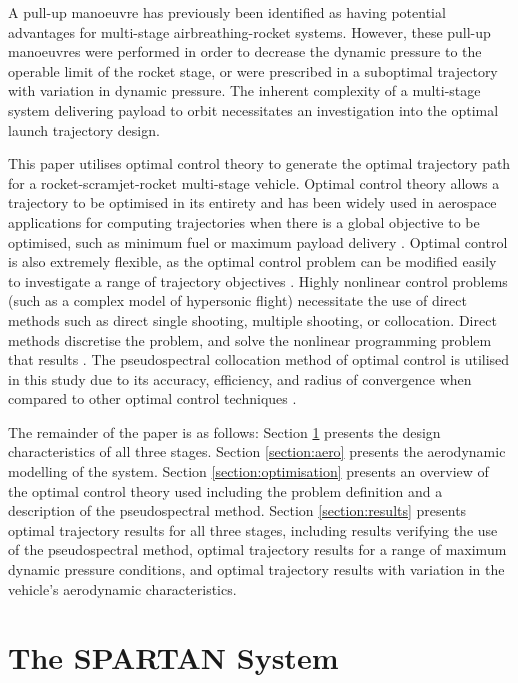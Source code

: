 \documentclass[]{aiaa-tc}
\begin{document}
  A pull-up manoeuvre has previously been identified as having potential advantages for multi-stage airbreathing-rocket systems\cite{Tsuchiya2005,Wilhite1991,Mehta2001}. 
  However, these pull-up manoeuvres were performed in order to decrease the dynamic pressure to the operable limit of the rocket stage\cite{Tsuchiya2005,Wilhite1991}, or were prescribed in a suboptimal trajectory with variation in dynamic pressure\cite{Mehta2001}. The inherent complexity of a multi-stage system delivering payload to orbit necessitates an investigation into the optimal launch trajectory design.

This paper utilises optimal control theory to generate the optimal trajectory path for a rocket-scramjet-rocket multi-stage vehicle.
Optimal control theory allows a trajectory to be optimised in its entirety and has been widely used in aerospace applications for computing trajectories when there is a global objective to be optimised, such as minimum fuel or maximum payload delivery \cite{Bedrossian,Josselyn2002,Sekhavat2005}. 
Optimal control is also extremely flexible, as the optimal control problem can be modified easily to investigate a range of trajectory objectives \cite{Ranieri2005}. 
Highly nonlinear control problems (such as a complex model of hypersonic flight) necessitate the use of direct methods such as direct single shooting, multiple shooting, or collocation. 
Direct methods discretise the problem, and solve the nonlinear programming problem that results \cite{Fahroo2000}. 
The pseudospectral collocation method of optimal control is utilised in this study due to its accuracy, efficiency, and radius of convergence when compared to other optimal control techniques \cite{Fahroo2000,Elganar}.

The remainder of the paper is as follows: Section \ref{section:system} presents the design characteristics of all three stages. Section \ref{section:aero} presents the aerodynamic modelling of the system. Section \ref{section:optimisation} presents an overview of the optimal control theory used including the problem definition and a description of the pseudospectral method. Section \ref{section:results} presents optimal trajectory results for all three stages, including results verifying the use of the pseudospectral method, optimal trajectory results for a range of maximum dynamic pressure conditions, and optimal trajectory results with variation in the vehicle's aerodynamic characteristics.

\section{The SPARTAN System} \label{section:system}
\end{document}
